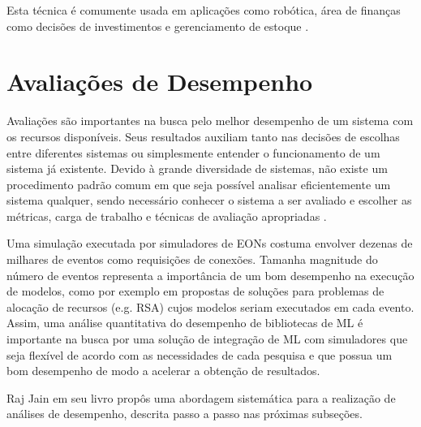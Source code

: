 Esta técnica é comumente usada em aplicações como robótica, área de finanças como decisões de investimentos e gerenciamento de estoque \cite{8527529}.






\section{Avaliações de Desempenho}
\label{performance_analysis_theory}

Avaliações são importantes na busca pelo melhor desempenho de um sistema com os recursos disponíveis. Seus resultados auxiliam tanto nas decisões de escolhas entre diferentes sistemas ou simplesmente entender o funcionamento de um sistema já existente. Devido à grande diversidade de sistemas, não existe um procedimento padrão comum em que seja possível analisar eficientemente um sistema qualquer, sendo necessário conhecer o sistema a ser avaliado e escolher as métricas, carga de trabalho e técnicas de avaliação apropriadas \cite{jain1991art}.

Uma simulação executada por simuladores de EONs costuma envolver dezenas de milhares de eventos como requisições de conexões. Tamanha magnitude do número de eventos representa a importância de um bom desempenho na execução de modelos, como por exemplo em propostas de soluções para problemas de alocação de recursos (e.g. RSA) cujos modelos seriam executados em cada evento. Assim, uma análise quantitativa do desempenho de bibliotecas de ML é importante na busca por uma solução de integração de ML com simuladores que seja flexível de acordo com as necessidades de cada pesquisa e que possua um bom desempenho de modo a acelerar a obtenção de resultados.

Raj Jain em seu livro \cite{jain1991art} propôs uma abordagem sistemática para a realização de análises de desempenho, descrita passo a passo nas próximas subseções.

